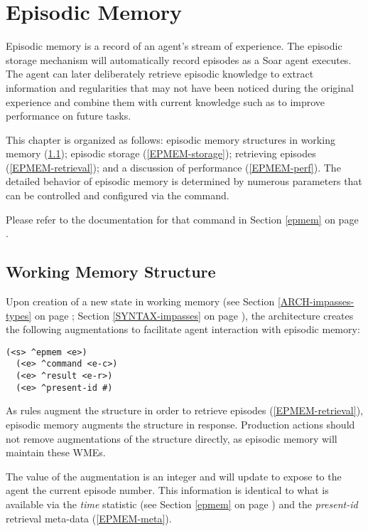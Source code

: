 \chapter{Episodic Memory}
\label{EPMEM}

Episodic memory is a record of an agent's stream of experience. 
The episodic storage mechanism will automatically record episodes as a Soar agent executes. 
The agent can later deliberately retrieve episodic knowledge to extract information and regularities that may not have been noticed during the original experience and combine them with current knowledge such as to improve performance on future tasks.

This chapter is organized as follows: episodic memory structures in working memory (\ref{EPMEM-wm}); episodic storage (\ref{EPMEM-storage}); retrieving episodes (\ref{EPMEM-retrieval}); and a discussion of performance (\ref{EPMEM-perf}). 
The detailed behavior of episodic memory is determined by numerous parameters that can be controlled and configured via the  command. 

Please refer to the documentation for that command in Section \ref{epmem} on page \pageref{epmem}.

\section{Working Memory Structure}
\label{EPMEM-wm}

Upon creation of a new state in working memory (see Section \ref{ARCH-impasses-types} on page \pageref{ARCH-impasses-types}; Section \ref{SYNTAX-impasses} on page \pageref{SYNTAX-impasses}), the architecture creates the following augmentations to facilitate agent interaction with episodic memory:

\begin{verbatim}
(<s> ^epmem <e>)
  (<e> ^command <e-c>)
  (<e> ^result <e-r>)
  (<e> ^present-id #)
\end{verbatim}

As rules augment the  structure in order to retrieve episodes (\ref{EPMEM-retrieval}), episodic memory augments the  structure in response.
Production actions should not remove augmentations of the  structure directly, as episodic memory will maintain these WMEs.

The value of the  augmentation is an integer and will update to expose to the agent the current episode number.
This information is identical to what is available via the \emph{time} statistic (see Section \ref{epmem} on page \pageref{epmem}) and the \emph{present-id} retrieval meta-data (\ref{EPMEM-meta}).

